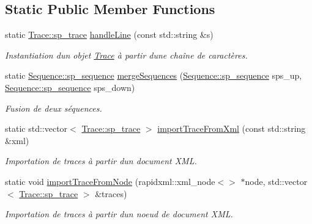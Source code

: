 \subsection*{Static Public Member Functions}
\begin{DoxyCompactItemize}
\item 
static \hyperlink{class_trace_a9c58e523529fc8a03fb6acf3eef86150}{Trace\+::sp\+\_\+trace} \hyperlink{class_traces_parser_af094e480d2d92e273ec454cc8bdb4c56}{handle\+Line} (const std\+::string \&s)
\begin{DoxyCompactList}\small\item\em Instantiation d\textquotesingle{}un objet \hyperlink{class_trace}{Trace} à partir d\textquotesingle{}une chaîne de caractères. \end{DoxyCompactList}\item 
static \hyperlink{class_sequence_a796bfa70aa4ddd4e447c210655b5dc5a}{Sequence\+::sp\+\_\+sequence} \hyperlink{class_traces_parser_ac304d9f86b7a99e29ec9d6aacd748d41}{merge\+Sequences} (\hyperlink{class_sequence_a796bfa70aa4ddd4e447c210655b5dc5a}{Sequence\+::sp\+\_\+sequence} sps\+\_\+up, \hyperlink{class_sequence_a796bfa70aa4ddd4e447c210655b5dc5a}{Sequence\+::sp\+\_\+sequence} sps\+\_\+down)
\begin{DoxyCompactList}\small\item\em Fusion de deux séquences. \end{DoxyCompactList}\item 
static std\+::vector$<$ \hyperlink{class_trace_a9c58e523529fc8a03fb6acf3eef86150}{Trace\+::sp\+\_\+trace} $>$ \hyperlink{class_traces_parser_a9a4c5e8e51fcb6feec230a0275a46c11}{import\+Trace\+From\+Xml} (const std\+::string \&xml)
\begin{DoxyCompactList}\small\item\em Importation de traces à partir d\textquotesingle{}un document X\+ML. \end{DoxyCompactList}\item 
static void \hyperlink{class_traces_parser_a515973e07e60b36499649239592f6edb}{import\+Trace\+From\+Node} (rapidxml\+::xml\+\_\+node$<$$>$ $\ast$node, std\+::vector$<$ \hyperlink{class_trace_a9c58e523529fc8a03fb6acf3eef86150}{Trace\+::sp\+\_\+trace} $>$ \&traces)
\begin{DoxyCompactList}\small\item\em Importation de traces à partir d\textquotesingle{}un noeud de document X\+ML. \end{DoxyCompactList}\item 
$$
\end{DoxyCompactItemize}
